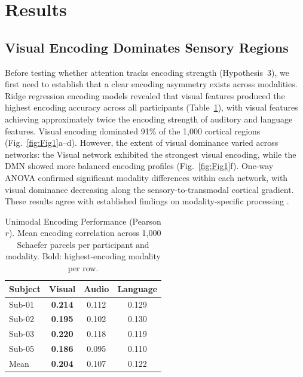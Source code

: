 \documentclass[conference]{IEEEtran}
\begin{document}
\section{Results}

\subsection{Visual Encoding Dominates Sensory Regions}

Before testing whether attention tracks encoding strength (Hypothesis~3), we first need to establish that a clear encoding asymmetry exists across modalities. Ridge regression encoding models revealed that visual features produced the highest encoding accuracy across all participants (Table~\ref{tab:encoding}), with visual features achieving approximately twice the encoding strength of auditory and language features. Visual encoding dominated 91\% of the 1,000 cortical regions (Fig.~\ref{fig:Fig1}a--d). However, the extent of visual dominance varied across networks: the Visual network exhibited the strongest visual encoding, while the DMN showed more balanced encoding profiles (Fig.~\ref{fig:Fig1}f). One-way ANOVA confirmed significant modality differences within each network, with visual dominance decreasing along the sensory-to-transmodal cortical gradient. These results agree with established findings on modality-specific processing \cite{gucclu2015deep}.

\begin{table}[t]
\caption{Unimodal Encoding Performance (Pearson $r$). Mean encoding correlation across 1{,}000 Schaefer parcels per participant and modality. Bold: highest-encoding modality per row.}
\label{tab:encoding}
\centering
\setlength{\tabcolsep}{8pt}
\begin{tabular}{lccc}
\toprule
Subject & Visual & Audio & Language \\
\midrule
Sub-01 & \textbf{0.214} & 0.112 & 0.129 \\
Sub-02 & \textbf{0.195} & 0.102 & 0.130 \\
Sub-03 & \textbf{0.220} & 0.118 & 0.119 \\
Sub-05 & \textbf{0.186} & 0.095 & 0.110 \\
\midrule
Mean & \textbf{0.204} & 0.107 & 0.122 \\
\bottomrule
\end{tabular}
\end{table}
\end{document}
